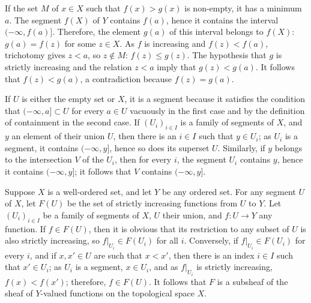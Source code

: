 \documentclass{article}
\begin{document}
\begin{solution}[\ref{exe:gsdhavsp}]
  \label{sol:ja6mjzt3}
  If the set \(M\) of \(x \in X\) such that \(f(x) > g(x)\) is
  non-empty, it has a minimum \(a\).  The segment \(f(X)\) of \(Y\)
  contains \(f(a)\), hence it contains the interval
  \((-\infty, f(a)]\).  Therefore, the element \(g(a)\) of this
  interval belongs to \(f(X)\): \(g(a) = f(z)\) for some \(z \in X\).
  As \(f\) is increasing and \(f(z) < f(a)\), trichotomy gives
  \(z < a\), so \(z \notin M\): \(f(z) \leq g(z)\).  The hypothesis
  that \(g\) is strictly increasing and the relation \(z < a\) imply
  that \(g(z) < g(a)\).  It follows that \(f(z) < g(a)\), a
  contradiction because \(f(z) = g(a)\).
\end{solution}

\begin{solution}[\ref{exe:rpm18mof}]
  \label{sol:aeu4zzog}
  If \(U\) is either the empty set or \(X\), it is a segment because
  it satisfies the condition that \((-\infty, a] \subset U\) for every
  \(a \in U\) vacuously in the first case and by the definition of
  containment in the second case.  If \((U_i)_{i \in I}\) is a family
  of segments of \(X\), and \(y\) an element of their union \(U\),
  then there is an \(i \in I\) such that \(y \in U_i\); as \(U_i\) is
  a segment, it contains \((-\infty, y]\), hence so does its superset
  \(U\).  Similarly, if \(y\) belongs to the intersection \(V\) of the
  \(U_i\), then for every \(i\), the segment \(U_i\) contains \(y\),
  hence it contains \((-\infty, y]\); it follows that \(V\) contains
  \((-\infty, y]\).

  Suppose \(X\) is a well-ordered set, and let \(Y\) be any ordered
  set.  For any segment \(U\) of \(X\), let \(F(U)\) be the set of
  strictly increasing functions from \(U\) to \(Y\).  Let
  \((U_i)_{i \in I}\) be a family of segments of \(X\), \(U\) their
  union, and \(f : U \to Y\) any function.  If \(f \in F(U)\), then it
  is obvious that its restriction to any subset of \(U\) is also
  strictly increasing, so \(f \vert_{U_i} \in F(U_i)\) for all \(i\).
  Conversely, if \(f \vert_{U_i} \in F(U_i)\) for every \(i\), and if
  \(x, x' \in U\) are such that \(x < x'\), then there is an index
  \(i \in I\) such that \(x' \in U_i\); as \(U_i\) is a segment,
  \(x \in U_i\), and as \(f \vert_{U_i}\) is strictly increasing,
  \(f(x) < f(x')\); therefore, \(f \in F(U)\).  It follows that \(F\)
  is a subsheaf of the sheaf of \(Y\)-valued functions on the
  topological space \(X\).


\end{solution}
\end{document}
